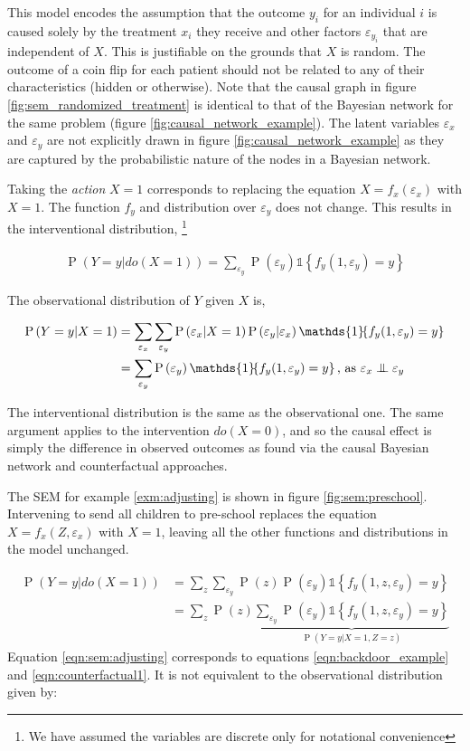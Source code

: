 \documentclass[11pt,a4paper,twoside]{report}
\newcommand{\set}[1]{\left\{#1\right\}}
\newcommand{\ind}[1]{\mathds{1}\!\!\set{#1}}
\newcommand{\eqn}[1]{\begin{align}#1\end{align}}
\renewcommand{\P}[1]{\operatorname{P}\left(#1\right)}
\theoremstyle{plain}
\theoremstyle{definition}
\let\epsilon\varepsilon
\newcommand{\ci}{\mathrel{\perp\mspace{-10mu}\perp}}
\begin{document}
This model encodes the assumption that the outcome $y_{i}$ for an individual $i$ is caused solely by the treatment $x_{i}$ they receive and other factors $\epsilon_{y_{i}}$ that are independent of $X$. This is justifiable on the grounds that $X$ is random. The outcome of a coin flip for each patient should not be related to any of their characteristics (hidden or otherwise). Note that the causal graph in figure \ref{fig:sem_randomized_treatment} is identical to that of the Bayesian network for the same problem (figure \ref{fig:causal_network_example}). The latent variables $\epsilon_x$ and $\epsilon_y$ are not explicitly drawn in figure \ref{fig:causal_network_example} as they are captured by the probabilistic nature of the nodes in a Bayesian network.

Taking the \emph{action} $X=1$ corresponds to replacing the equation $X=f_x(\epsilon_x)$ with $X=1$. The function $f_y$ and distribution over $\epsilon_y$ does not change. This results in the interventional distribution, \footnote{We have assumed the variables are discrete only for notational convenience}

\eqn {
\P{Y=y|do(X=1)} = \sum_{\epsilon_y}\P{\epsilon_y}\ind{f_y(1,\epsilon_y)=y}
}

The observational distribution of $Y$ given $X$ is,

\eqn{
\P{Y=y|X=1} &= \sum_{\epsilon_x}\sum_{\epsilon_y}\P{\epsilon_x|X=1}\P{\epsilon_y|\epsilon_x}\ind{f_y(1,\epsilon_y)=y} \\
& = \sum_{\epsilon_y}\P{\epsilon_y}\ind{f_y(1,\epsilon_y)=y} \text{, as } \epsilon_x \ci \epsilon_y
}

The interventional distribution is the same as the observational one. The same argument applies to the intervention $do(X=0)$, and so the causal effect is simply the difference in observed outcomes as found via the causal Bayesian network and counterfactual approaches. 

The SEM for example \ref{exm:adjusting} is shown in figure \ref{fig:sem:preschool}. Intervening to send all children to pre-school replaces the equation $X = f_x(Z,\epsilon_x)$ with $X=1$, leaving all the other functions and distributions in the model unchanged. 

\eqn{
\P{Y=y|do(X=1)} &= \sum_{z}\sum_{\epsilon_y}\P{z}\P{\epsilon_y}\ind{f_y(1,z,\epsilon_y)=y} \\
\label{eqn:sem:adjusting}
&=\sum_{z}\P{z}\underbrace{\sum_{\epsilon_y}\P{\epsilon_y}\ind{f_y(1,z,\epsilon_y)=y}}_{\P{Y=y|X=1,Z=z}}
}
Equation \ref{eqn:sem:adjusting} corresponds to equations \ref{eqn:backdoor_example} and \ref{eqn:counterfactual1}. It is not equivalent to the observational distribution given by:
\end{document}
